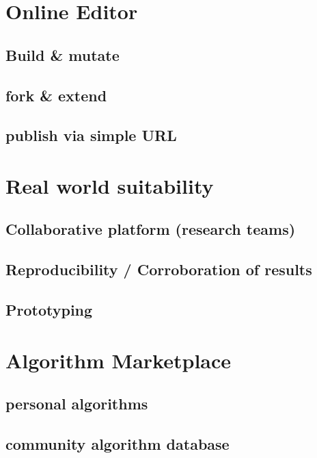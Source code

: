 \section{Online Editor}
\label{sect:online_editor}

	\subsection{Build \& mutate}
	\label{ssect: build_edit}
	
	\subsection{fork \& extend}
	\label{ssect: fork_extend}
	
	\subsection{publish via simple URL}
	\label{ssect: publish_url}



\section{Real world suitability}
\label{sect:realworld_suitability}

	\subsection{Collaborative platform (research teams)}
	\label{ssect:collaborative_platform}

	\subsection{Reproducibility / Corroboration of results}
	\label{ssect:reproducibility}
		
	\subsection{Prototyping}
	\label{ssect: prototyping}



\section{Algorithm Marketplace}
\label{sect:algo_marketplace}

\subsection{personal algorithms}
\label{ssect:algo_personal}

\subsection{community algorithm database}
\label{ssect:community_algo_db}


	